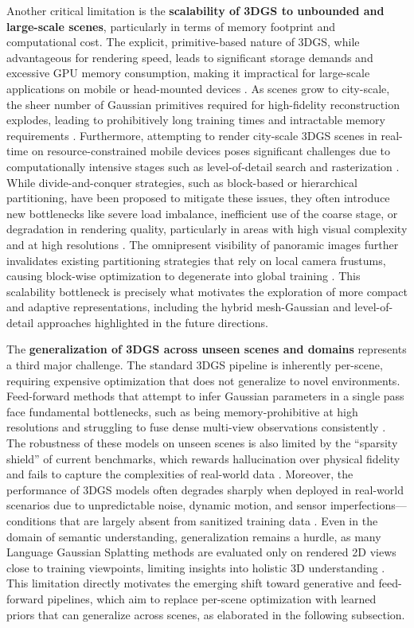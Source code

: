\documentclass[11pt]{article}
\begin{document}
Another critical limitation is the \textbf{scalability of 3DGS to unbounded and large-scale scenes}, particularly in terms of memory footprint and computational cost. The explicit, primitive-based nature of 3DGS, while advantageous for rendering speed, leads to significant storage demands and excessive GPU memory consumption, making it impractical for large-scale applications on mobile or head-mounted devices \cite{ref451,ref54}. As scenes grow to city-scale, the sheer number of Gaussian primitives required for high-fidelity reconstruction explodes, leading to prohibitively long training times and intractable memory requirements \cite{ref113,ref698}. Furthermore, attempting to render city-scale 3DGS scenes in real-time on resource-constrained mobile devices poses significant challenges due to computationally intensive stages such as level-of-detail search and rasterization \cite{ref763}. While divide-and-conquer strategies, such as block-based or hierarchical partitioning, have been proposed to mitigate these issues, they often introduce new bottlenecks like severe load imbalance, inefficient use of the coarse stage, or degradation in rendering quality, particularly in areas with high visual complexity and at high resolutions \cite{ref113,ref73}. The omnipresent visibility of panoramic images further invalidates existing partitioning strategies that rely on local camera frustums, causing block-wise optimization to degenerate into global training \cite{ref109}. This scalability bottleneck is precisely what motivates the exploration of more compact and adaptive representations, including the hybrid mesh-Gaussian and level-of-detail approaches highlighted in the future directions.

The \textbf{generalization of 3DGS across unseen scenes and domains} represents a third major challenge. The standard 3DGS pipeline is inherently per-scene, requiring expensive optimization that does not generalize to novel environments. Feed-forward methods that attempt to infer Gaussian parameters in a single pass face fundamental bottlenecks, such as being memory-prohibitive at high resolutions and struggling to fuse dense multi-view observations consistently \cite{ref236}. The robustness of these models on unseen scenes is also limited by the ``sparsity shield'' of current benchmarks, which rewards hallucination over physical fidelity and fails to capture the complexities of real-world data \cite{ref764}. Moreover, the performance of 3DGS models often degrades sharply when deployed in real-world scenarios due to unpredictable noise, dynamic motion, and sensor imperfections---conditions that are largely absent from sanitized training data \cite{ref765}. Even in the domain of semantic understanding, generalization remains a hurdle, as many Language Gaussian Splatting methods are evaluated only on rendered 2D views close to training viewpoints, limiting insights into holistic 3D understanding \cite{ref766}. This limitation directly motivates the emerging shift toward generative and feed-forward pipelines, which aim to replace per-scene optimization with learned priors that can generalize across scenes, as elaborated in the following subsection.
\end{document}
